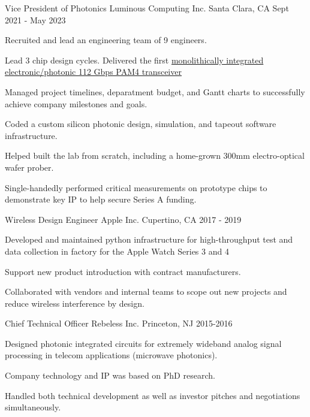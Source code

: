 \begin{cventries}
  \cventry
    {Vice President of Photonics} %
    {Luminous Computing Inc.}
    {Santa Clara, CA} %
    {Sept 2021 - May 2023} %
    {
      \begin{cvitems} %
        \item {Recruited and lead an engineering team of 9 engineers.}
        \item {Lead 3 chip design cycles. Delivered the first \href{https://preprints.opticaopen.org/articles/preprint/Monolithically_integrated_112_Gbps_PAM4_optical_transmitter_and_receiver_in_a_45nm_CMOS-silicon_photonics_process/22814837}{monolithically integrated electronic/photonic 112 Gbps PAM4 transceiver}}
        \item {Managed project timelines, deparatment budget, and Gantt charts to successfully achieve company milestones and goals.}
        \item {Coded a custom silicon photonic design, simulation, and tapeout software infrastructure.}
        \item {Helped built the lab from scratch, including a home-grown 300mm electro-optical wafer prober.}
        \item {Single-handedly performed critical measurements on prototype chips to demonstrate key IP to help secure Series A funding.}
      \end{cvitems}
    }
    
  \cventry
    {Wireless Design Engineer} %
    {Apple Inc. }
    {Cupertino, CA} %
    {2017 - 2019} %
    {
      \begin{cvitems} %
        \item {Developed and maintained python infrastructure for high-throughput test and data collection in factory for the Apple Watch Series 3 and 4}
        \item {Support new product introduction with contract manufacturers.}
        \item {Collaborated with vendors and internal teams to scope out new projects and reduce wireless interference by design.}
      \end{cvitems}
    }
    
  \cventry
    {Chief Technical Officer} %
    {Rebeless Inc.}
    {Princeton, NJ} %
    {2015-2016} %
    {
      \begin{cvitems} %
        \item {Designed photonic integrated circuits for extremely wideband analog signal processing in telecom applications (microwave photonics).}
        \item {Company technology and IP was based on PhD research.}
        \item {Handled both technical development as well as investor pitches and negotiations simultaneously.}
      \end{cvitems}
    }

\end{cventries}
